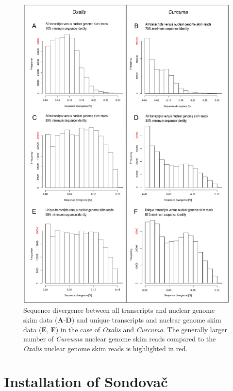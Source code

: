 \documentclass[a4paper, 11pt, twoside]{article}
\begin{document}
\begin{figure}[p]
\begin{center}
\includegraphics[width=15cm]{sequence_divergence_transcripts.png}
\end{center}
\caption[Sequence divergence examples.]{Sequence divergence between all transcripts and nuclear genome skim data (\textbf{A}-\textbf{D}) and unique transcripts and nuclear genome skim data (\textbf{E}, \textbf{F}) in the case of \textit{Oxalis} and \textit{Curcuma}. The generally larger number of \textit{Curcuma} nuclear genome skim reads compared to the \textit{Oxalis} nuclear genome skim reads is highlighted in red.}
\label{seq-div-examples}
\end{figure}

\section{Installation of Sondovač}
\label{install}
\end{document}
